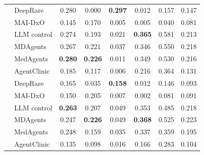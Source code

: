 \begin{table}[hbpt]
\begin{tabular}{@{}llcccccc@{}}
 & DeepRare & 0.280 & 0.000 & \textbf{0.297} & 0.012 & 0.157 & 0.147 \\
 & MAI-DxO & 0.145 & 0.170 & 0.005 & 0.005 & 0.040 & 0.081 \\
\midrule
{} & LLM control & 0.274 & 0.193 & 0.021 & \textbf{0.365} & 0.581 & 0.213 \\
 & MDAgents & 0.267 & 0.221 & 0.037 & 0.346 & 0.550 & 0.218 \\
 & MedAgents & \textbf{0.280} & \textbf{0.226} & 0.011 & 0.349 & 0.530 & 0.216 \\
 & AgentClinic & 0.185 & 0.117 & 0.006 & 0.216 & 0.364 & 0.131 \\
 & DeepRare & 0.165 & 0.035 & \textbf{0.158} & 0.012 & 0.146 & 0.093 \\
 & MAI-DxO & 0.150 & 0.205 & 0.007 & 0.002 & 0.081 & 0.091 \\
\midrule
{} & LLM control & \textbf{0.263} & 0.207 & 0.049 & 0.353 & 0.485 & 0.218 \\
 & MDAgents & 0.247 & \textbf{0.226} & 0.049 & \textbf{0.368} & 0.525 & 0.223 \\
 & MedAgents & 0.248 & 0.159 & 0.035 & 0.337 & 0.359 & 0.195 \\
 & AgentClinic & 0.135 & 0.098 & 0.016 & 0.166 & 0.283 & 0.104 \\

\end{tabular}
\end{table}
